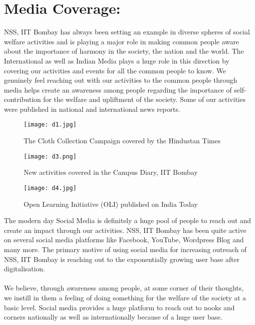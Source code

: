 \section*{ Media Coverage:}   NSS, IIT Bombay has always been setting an example in diverse spheres of social welfare activities and is playing a major role in making common people aware about the importance of harmony in the society, the nation and the world. The International as well as Indian Media plays a huge role in this direction by covering our activities and events for all the common people to know. We genuinely feel reaching out with our activities to the common people through media helps create an awareness among people regarding the importance of self-contribution for the welfare and upliftment of the society. Some of our activities were published in national and international news reports.

\begin{figure}[H]
\centering
\texttt{[image: d1.jpg]}
\caption*{The Cloth Collection Campaign covered by the Hindustan Times}
\end{figure}

\begin{figure}[H]
\centering
\texttt{[image: d3.png]}
\caption*{New activities covered in the Campus Diary, IIT Bombay}
\end{figure}

\begin{figure}[H]
\centering
\texttt{[image: d4.jpg]}
\caption*{Open Learning Initiative (OLI) published on India Today}
\end{figure}

The modern day Social Media is definitely a huge pool of people to reach out and create an impact through our activities. NSS, IIT Bombay has been quite active on several social media platforms like Facebook, YouTube, Wordpress Blog and many more. The primary motive of using social media for increasing outreach of NSS, IIT Bombay is reaching out
to the exponentially growing user base after digitalisation. \\ \\  We believe, through awareness among people, at some corner of their thoughts, we instill in them a
feeling of doing something for the welfare of the society at a basic level. Social media provides a huge platform to reach out to nooks and corners nationally as well as internationally because of a huge user base.

